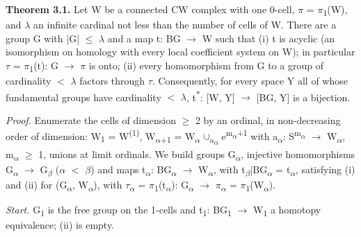 \textbf{Theorem 3.1.} Let W be a connected CW complex with one 0-cell, \ensuremath{\pi} = \ensuremath{\pi}\textsubscript{1}(W), and \ensuremath{\lambda} an infinite cardinal not less than the number of cells of W. There are a group G with |G| \ensuremath{\leq} \ensuremath{\lambda} and a map t: BG \ensuremath{\to} W such that (i) t is acyclic (an isomorphism on homology with every local coefficient system on W); in particular \ensuremath{\tau} = \ensuremath{\pi}\textsubscript{1}(t): G \ensuremath{\to} \ensuremath{\pi} is onto; (ii) every homomorphism from G to a group of cardinality \ensuremath{<} \ensuremath{\lambda} factors through \ensuremath{\tau}. Consequently, for every space Y all of whose fundamental groups have cardinality \ensuremath{<} \ensuremath{\lambda}, t\textsuperscript{*}: [W, Y] \ensuremath{\to} [BG, Y] is a bijection.

\emph{Proof.} Enumerate the cells of dimension \ensuremath{\geq} 2 by an ordinal, in non-decreasing order of dimension: W\textsubscript{1} = W\textsuperscript{(1)}, W\textsubscript{\ensuremath{\alpha}+1} = W\textsubscript{\ensuremath{\alpha}} \ensuremath{\cup}\textsubscript{a\textsubscript{\ensuremath{\alpha}}} e\textsuperscript{m\textsubscript{\ensuremath{\alpha}}+1} with a\textsubscript{\ensuremath{\alpha}}: S\textsuperscript{m\textsubscript{\ensuremath{\alpha}}} \ensuremath{\to} W\textsubscript{\ensuremath{\alpha}}, m\textsubscript{\ensuremath{\alpha}} \ensuremath{\geq} 1, unions at limit ordinals. We build groups G\textsubscript{\ensuremath{\alpha}}, injective homomorphisms G\textsubscript{\ensuremath{\alpha}} \ensuremath{\to} G\textsubscript{\ensuremath{\beta}} (\ensuremath{\alpha} \ensuremath{<} \ensuremath{\beta}) and maps t\textsubscript{\ensuremath{\alpha}}: BG\textsubscript{\ensuremath{\alpha}} \ensuremath{\to} W\textsubscript{\ensuremath{\alpha}}, with t\textsubscript{\ensuremath{\beta}}|BG\textsubscript{\ensuremath{\alpha}} = t\textsubscript{\ensuremath{\alpha}}, satisfying (i) and (ii) for (G\textsubscript{\ensuremath{\alpha}}, W\textsubscript{\ensuremath{\alpha}}), with \ensuremath{\tau}\textsubscript{\ensuremath{\alpha}} = \ensuremath{\pi}\textsubscript{1}(t\textsubscript{\ensuremath{\alpha}}): G\textsubscript{\ensuremath{\alpha}} \ensuremath{\to} \ensuremath{\pi}\textsubscript{\ensuremath{\alpha}} = \ensuremath{\pi}\textsubscript{1}(W\textsubscript{\ensuremath{\alpha}}).

\emph{Start.} G\textsubscript{1} is the free group on the 1-cells and t\textsubscript{1}: BG\textsubscript{1} \ensuremath{\to} W\textsubscript{1} a homotopy equivalence; (ii) is empty.

